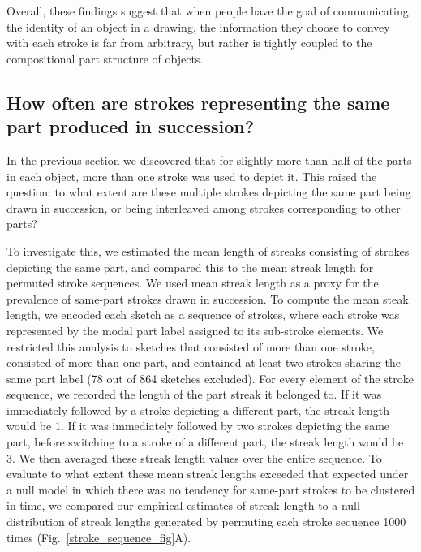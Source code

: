 \documentclass[10pt,letterpaper]{article}
\begin{document}
Overall, these findings suggest that when people have the goal of communicating the identity of an object in a drawing, the information they choose to convey with each stroke is far from arbitrary, but rather is tightly coupled to the compositional part structure of objects. 

\subsection{How often are strokes representing the same part produced in succession?}

In the previous section we discovered that for slightly more than half of the parts in each object, more than one stroke was used to depict it. 
This raised the question: to what extent are these multiple strokes depicting the same part being drawn in succession, or being interleaved among strokes corresponding to other parts?

To investigate this, we estimated the mean length of streaks consisting of strokes depicting the same part, and compared this to the mean streak length for permuted stroke sequences. 
We used mean streak length as a proxy for the prevalence of same-part strokes drawn in succession. 
To compute the mean steak length, we encoded each sketch as a sequence of strokes, where each stroke was represented by the modal part label assigned to its sub-stroke elements. 
We restricted this analysis to sketches that consisted of more than one stroke, consisted of more than one part, and contained at least two strokes sharing the same part label (78 out of 864 sketches excluded). 
For every element of the stroke sequence, we recorded the length of the part streak it belonged to. 
If it was immediately followed by a stroke depicting a different part, the streak length would be 1. 
If it was immediately followed by two strokes depicting the same part, before switching to a stroke of a different part, the streak length would be 3. 
We then averaged these streak length values over the entire sequence. 
To evaluate to what extent these mean streak lengths exceeded that expected under a null model in which there was no tendency for same-part strokes to be clustered in time, we compared our empirical estimates of streak length to a null distribution of streak lengths generated by permuting each stroke sequence 1000 times (Fig.~\ref{stroke_sequence_fig}A). 
\end{document}
